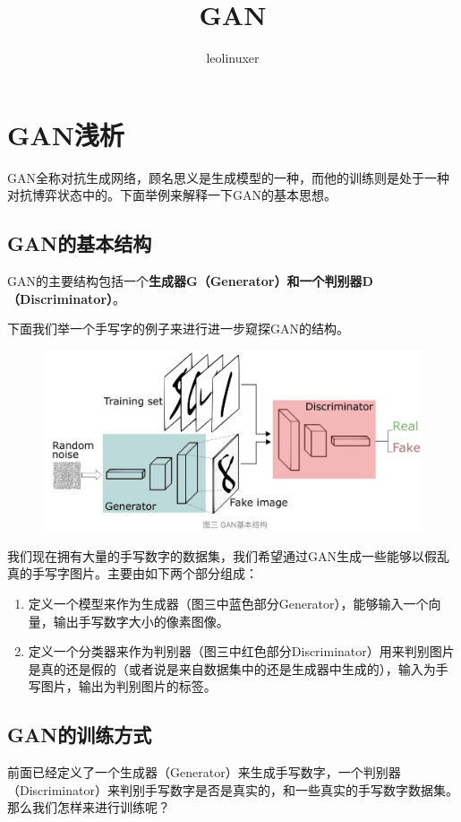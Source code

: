 \documentclass[12pt]{article}
\title{GAN\cite{Understand_Gan_In_Common}\cite{Understand_Gan_Otherwise_Bite}\cite{GAN_Overview_Chinese}}
\author{leolinuxer}
\begin{document}
\maketitle
\tableofcontents

\section{GAN浅析}
GAN全称对抗生成网络，顾名思义是生成模型的一种，而他的训练则是处于一种对抗博弈状态中的。下面举例来解释一下GAN的基本思想。

\subsection{GAN的基本结构}
GAN的主要结构包括一个\textbf{生成器G（Generator）和一个判别器D（Discriminator）}。

下面我们举一个手写字的例子来进行进一步窥探GAN的结构。
\begin{figure}[H]
    \centering
    \includegraphics[width=1\textwidth]{fig/GAN_Basic_Structure.png}
\end{figure}

我们现在拥有大量的手写数字的数据集，我们希望通过GAN生成一些能够以假乱真的手写字图片。主要由如下两个部分组成：
\begin{enumerate}
\setlength{\itemsep}{0pt}
\setlength{\parsep}{0pt}
\setlength{\parskip}{0pt}
    \item 定义一个模型来作为生成器（图三中蓝色部分Generator），能够输入一个向量，输出手写数字大小的像素图像。
    \item 定义一个分类器来作为判别器（图三中红色部分Discriminator）用来判别图片是真的还是假的（或者说是来自数据集中的还是生成器中生成的），输入为手写图片，输出为判别图片的标签。
\end{enumerate}

\subsection{GAN的训练方式}
前面已经定义了一个生成器（Generator）来生成手写数字，一个判别器（Discriminator）来判别手写数字是否是真实的，和一些真实的手写数字数据集。那么我们怎样来进行训练呢？
\end{document}

